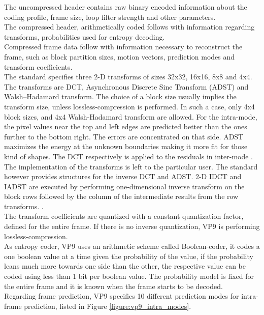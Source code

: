 \documentclass[a4paper,11pt,oneside]{article}
\begin{document}
The uncompressed header contains raw binary encoded information about the coding profile, frame size, loop filter strength and other parameters. \\
The compressed header, arithmetically coded follows with information regarding transforms, probabilities used for entropy decoding.\\
Compressed frame data follow with information necessary to reconstruct the frame, such as block partition sizes, motion vectors, prediction modes and transform coefficients.\\
\indent The standard specifies three 2-D transforms of sizes 32x32, 16x16, 8x8 and 4x4. The transforms are DCT, Asynchronous Discrete Sine Transform (ADST) and Walsh–Hadamard transform. The choice of a block size usually implies the transform size, unless lossless-compression is performed. In such a case, only 4x4 block sizes, and 4x4 Walsh-Hadamard transform are allowed. For the intra-mode, the pixel values near the top and left edges are predicted better than the ones further to the bottom right. The errors are concentrated on that side. ADST maximizes the energy at the unknown boundaries making it more fit for those kind of shapes. The DCT respectively is applied to the residuals in inter-mode \cite[pp.~16]{vp9_bitstream}. The implementation of the transforms is left to the particular user. The standard however provides structures for the inverse DCT and ADST. 2-D IDCT and IADST are executed by performing one-dimensional inverse transform on the block rows followed by the column of the intermediate results from the row transforms. \cite[pp.~18-19]{vp9_bitstream}. \\
\indent The transform coefficients are quantized with a constant quantization factor, defined for the entire frame. If there is no inverse quantization, VP9 is performing lossless-compression.\\
\indent As entropy coder, VP9 uses an arithmetic scheme called Boolean-coder, it codes a one boolean value at a time given the probability of the value, if the probability leans much more towards one side than the other, the respective value can be coded using less than 1 bit per boolean value. The probability model is fixed for the entire frame and it is known when the frame starts to be decoded. \cite[pp.~77]{vp9_bitstream}\\
\indent Regarding frame prediction, VP9 specifies 10 different prediction modes for intra-frame prediction, listed in Figure \ref{figure:vp9_intra_modes}.\\
\end{document}
